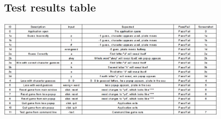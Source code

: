 \documentclass[notitlepage]{report}
\begin{document}
\begin{figure}[H]
\subsection{Test results table}
  \centerline{\includegraphics[scale=0.5]{testtable}}
  \label{fig:label}
\end{figure}


\newpage
\end{document}
